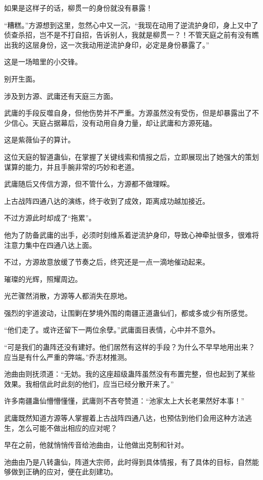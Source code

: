 \begin{this_body}
如果是这样子的话，柳贯一的身份就没有暴露！

“糟糕。”方源想到这里，忽然心中又一沉，“我现在动用了逆流护身印，身上又中了侦查杀招，岂不是不打自招，告诉别人，我就是柳贯一？！不管天庭之前有没有瞧出我的这层身份，这一次我动用逆流护身印，必定是身份暴露了。”

这是一场暗里的小交锋。

别开生面。

涉及到方源、武庸还有天庭三方面。

武庸的手段反噬自身，但他伤势并不严重。方源虽然没有受伤，但是却暴露出了不少信心。天庭占据幕后，没有动用自身力量，却让武庸和方源死磕。

这是紫薇仙子的算计。

这位天庭的智道蛊仙，在掌握了关键线索和情报之后，立即展现出了她强大的策划谋算的能力，并且手腕非常的巧妙和老道。

武庸随后又传信方源，但不管什么，方源都不做理睬。

上古战阵四通八达的演练，终于收到了成效，距离成功越加接近。

不过方源此时却成了“拖累”。

他为了防备武庸的出手，必须时刻维系着逆流护身印，导致心神牵扯很多，很难将注意力集中在四通八达上面。

不过，方源故意放缓了节奏之后，终究还是一点一滴地催动起来。

璀璨的光辉，照耀周边。

光芒骤然消散，方源等人都消失在原地。

强烈的宇道波动，让围剿在梦境外围的南疆正道蛊仙们，都或多或少有所感觉。

“他们走了。或许还留下一两位余孽。”武庸面目表情，心中并不意外。

“可是我们的蛊阵还没有建好。他们居然有这样的手段？为什么不早早地用出来？应当是有什么严重的弊端。”乔志材推测。

池曲由则抚须道：“无妨。我的这座超级蛊阵虽然没有布置完整，但也起到了某些效果。我相信此时此刻的他们，应当已经分散开来了。”

许多南疆蛊仙懵懵懂懂，武庸则不吝夸赞道：“池家太上大长老果然好本事！”

武庸既然知道方源等人掌握着上古战阵四通八达，也预估到他们会用这种方法逃生，怎么可能不做出相应的应对呢？

早在之前，他就悄悄传音给池曲由，让他做出克制和针对。

池曲由乃是八转蛊仙，阵道大宗师，此时得到具体情报，有了具体的目标，自然能够做到正确的应对，便在此刻建功。


\end{this_body}
